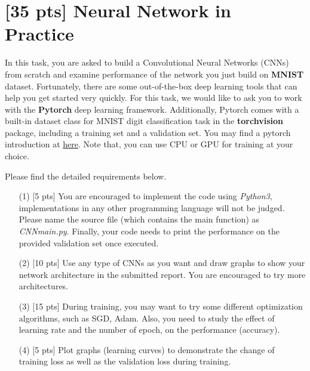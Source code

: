 \documentclass{article}
\begin{document}
	
	\vspace{3cm}
	

	\section{[35 pts] Neural Network in Practice}
	
	In this task, you are asked to build a Convolutional Neural Networks (CNNs) from scratch and examine performance of the network you just build on \textbf{MNIST} dataset.
	Fortunately, there are some out-of-the-box deep learning tools that can help you get started very quickly. For this task, we would like to ask you to work with the \textbf{Pytorch} deep learning framework. Additionally, Pytorch comes with a built-in dataset class for MNIST digit classification task in the \textbf{torchvision} package, including a training set and a validation set. You may find a pytorch introduction at \href{https://pytorch.org/tutorials/beginner/blitz/cifar10_tutorial.html}{here}. Note that, you can use CPU or GPU for training at your choice.
	
	Please find the detailed requirements below.
	
	\begin{enumerate}
		    \item[(1)] [5 pts] You are encouraged to implement the code using \emph{Python3}, implementations in any other programming language will not be judged. Please name the source file (which contains the main function) as \emph{CNN\underline{\hspace{0.5em}}main.py}. Finally, your code needs to print the performance on the provided validation set once executed.
		    
		    \item[(2)] [10 pts] Use any type of CNNs as you want and draw graphs to show your network architecture in the submitted report. You are encouraged to try more architectures.
		    
		    \item [(3)] [15 pts] During training, you may want to try some different optimization algorithms, such as SGD, Adam. Also, you need to study the effect of learning rate and the number of epoch, on the performance (accuracy).
		    
		    \item [(4)] [5 pts] Plot graphs (learning curves) to demonstrate the change of training loss as well as the validation loss during training.
\end{enumerate}
\end{document}
